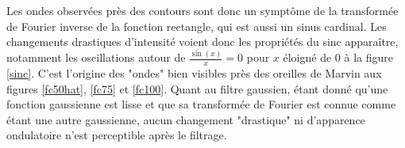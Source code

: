 \documentclass[11pt,letterpaper]{article}
\begin{document}
Les ondes observées près des contours sont donc un symptôme de la transformée de Fourier inverse de la fonction rectangle, qui est aussi un sinus cardinal. Les changements drastiques d'intensité voient donc les propriétés du sinc apparaître, notamment les oscillations autour de $\frac{\sin\left( x \right)}{x}  = 0$ pour $x$ éloigné de 0 à la figure \ref{sinc}. C'est l'origine des "ondes" bien visibles près des oreilles de Marvin aux figures \ref{fc50hat}, \ref{fc75} et \ref{fc100}. Quant au filtre gaussien, étant donné qu'une fonction gaussienne est lisse et que sa transformée de Fourier est connue comme étant une autre gaussienne, aucun changement "drastique" ni d'apparence ondulatoire n'est perceptible après le filtrage.

\clearpage



\end{document}

